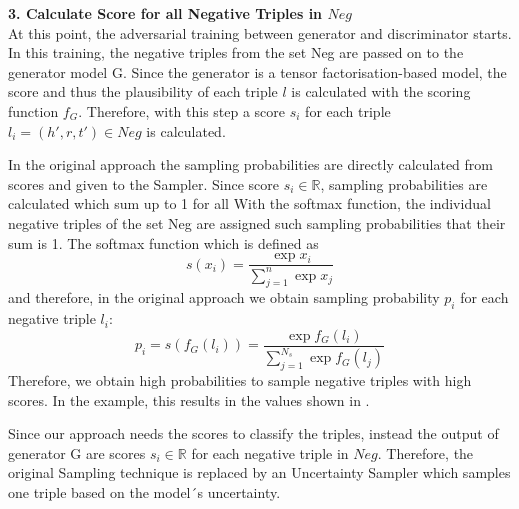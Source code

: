 \textbf{3. Calculate Score for all Negative Triples in $Neg$}\\

At this point, the adversarial training between generator and discriminator starts.
In this training, the negative triples from the set Neg are passed on to the generator model G.
Since the generator is a tensor factorisation-based model, the score and thus the plausibility of each triple $l$ is calculated with the scoring function $f_G$.
Therefore, with this step a score $s_i$ for each triple $l_i = (h',r,t') \in Neg$ is calculated.

In the original \kbgan approach the sampling probabilities are directly calculated from scores and given to the Sampler.
Since score $s_i \in \mathbb{R}$, sampling probabilities are calculated which sum up to 1 for all 
With the softmax function, the individual negative triples of the set Neg are assigned such sampling probabilities that their sum is 1.
The softmax function which is defined as 
\begin{equation}
    s(x_i) = \frac{\exp{x_i}}{\sum_{j=1}^{n}{\exp{x_j}}}
\end{equation}
and therefore, in the  original approach we obtain sampling probability $p_i$ for each negative triple $l_i$:
\begin{equation}
    p_i = s(f_G(l_i)) = \frac{\exp{f_G(l_i)}}{\sum_{j=1}^{N_s}{\exp{f_G(l_j)}}}
\end{equation}
Therefore, we obtain high probabilities to sample negative triples with high scores.
In the example, this results in the values shown in .


Since our approach needs the scores to classify the triples, instead the output of generator G are scores $s_i \in \mathbb{R}$ for each negative triple in $Neg$.
Therefore, the original Sampling technique is replaced by an Uncertainty Sampler which samples one triple based on the model´s uncertainty.


